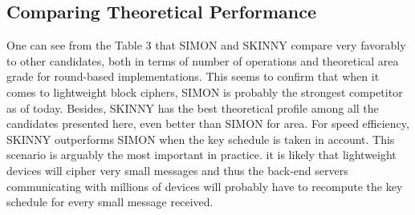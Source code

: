 \documentclass[preprint]{transcrypto}
\begin{document}
\subsection{Comparing Theoretical Performance}
\tab One can see from the Table 3 that SIMON and SKINNY compare very favorably to
other candidates, both in terms of number of operations and theoretical area grade for
round-based implementations. This seems to confirm that when it comes to lightweight
block ciphers, SIMON is probably the strongest competitor as of today. Besides, SKINNY
has the best theoretical profile among all the candidates presented here, even better than
SIMON for area. For speed efficiency, SKINNY outperforms SIMON when the key schedule is
taken in account. This scenario is arguably the most important in practice. it is likely that lightweight devices will cipher very small messages and thus the
back-end servers communicating with millions of devices will probably have to recompute
the key schedule for every small message received.
\end{document}
